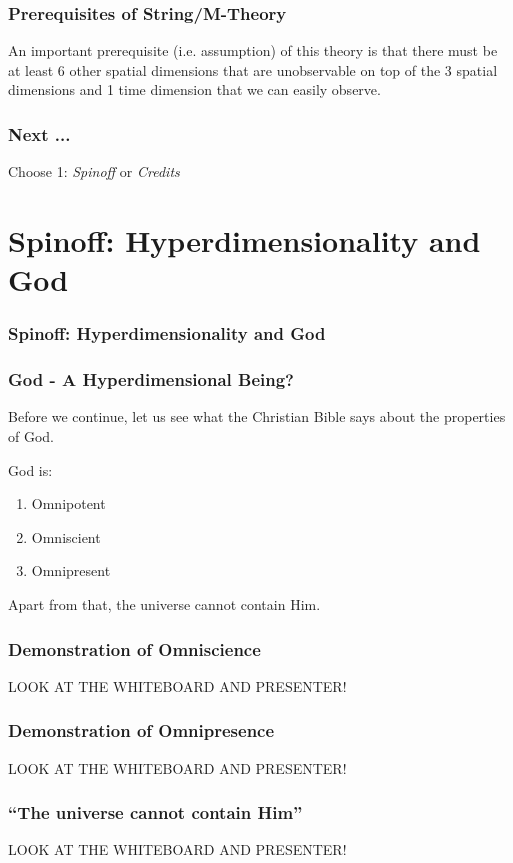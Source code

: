 \documentclass{beamer}
\begin{document}
\begin{frame}
\frametitle{Prerequisites of String/M-Theory}

An important prerequisite (i.e. assumption) of this theory is that there must be at least 6 other spatial dimensions that are unobservable on top of the 3 spatial dimensions and 1 time dimension that we can easily observe.

\end{frame}

\begin{frame}
\frametitle{Next ... }
Choose 1: \emph{Spinoff} or \emph{Credits}
\end{frame}

\section{Spinoff: Hyperdimensionality and God}

\begin{frame}
\frametitle{Spinoff: Hyperdimensionality and God}
\end{frame}

\begin{frame}
\frametitle{God - A Hyperdimensional Being?}

Before we continue, let us see what the Christian Bible says about the properties of God.

God is:

\begin{enumerate}
\item Omnipotent
\item Omniscient
\item Omnipresent
\end{enumerate}

Apart from that, the universe cannot contain Him.

\end{frame}

\begin{frame}
\frametitle{Demonstration of Omniscience}
\alert{LOOK AT THE WHITEBOARD AND PRESENTER!}
\end{frame}

\begin{frame}
\frametitle{Demonstration of Omnipresence}
\alert{LOOK AT THE WHITEBOARD AND PRESENTER!}
\end{frame}

\begin{frame}
\frametitle{``The universe cannot contain Him''}
\alert{LOOK AT THE WHITEBOARD AND PRESENTER!}
\end{frame}
\end{document}
